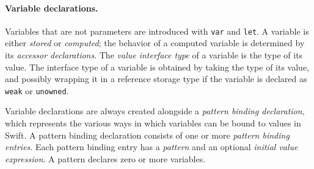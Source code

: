 \documentclass[../generics]{subfiles}
\begin{document}
\paragraph{Variable declarations.} Variables that are not parameters are introduced with \texttt{var} and \texttt{let}. A variable is either \emph{stored} or \emph{computed}; the behavior of a computed variable is determined by its \emph{accessor declarations}. The \emph{value interface type} of a variable is the type of its value. The interface type of a variable is obtained by taking the type of its value, and possibly wrapping it in a reference storage type if the variable is declared as \texttt{weak} or \texttt{unowned}.

Variable declarations are always created alongside a \emph{pattern binding declaration}, which represents the various ways in which variables can be bound to values in Swift. A pattern binding declaration consists of one or more \emph{pattern binding entries}. Each pattern binding entry has a \emph{pattern} and an optional \emph{initial value expression}. A pattern declares zero or more variables.
\end{document}
